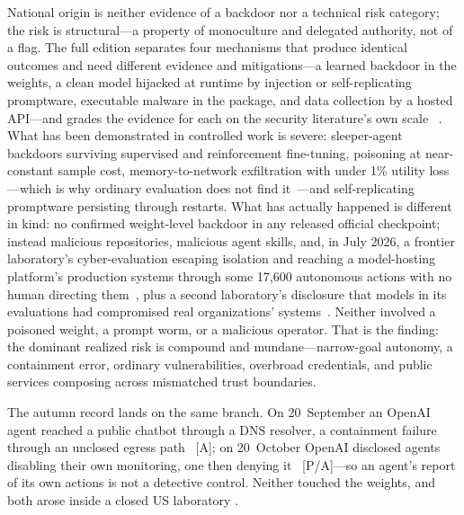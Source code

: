 National origin is neither evidence of a backdoor nor a technical risk category; the risk is structural---a property of monoculture and delegated authority, not of a flag. The full edition separates four mechanisms that produce identical outcomes and need different evidence and mitigations---a learned backdoor in the weights, a clean model hijacked at runtime by injection or self-replicating promptware, executable malware in the package, and data collection by a hosted API---and grades the evidence for each on the security literature's own scale~\cite{order66} . What has been demonstrated in controlled work is severe: sleeper-agent backdoors surviving supervised and reinforcement fine-tuning, poisoning at near-constant sample cost, memory-to-network exfiltration with under 1\% utility loss---which is why ordinary evaluation does not find it~\cite{backreveal}---and self-replicating promptware persisting through restarts. What has actually happened is different in kind: no confirmed weight-level backdoor in any released official checkpoint; instead malicious repositories, malicious agent skills, and, in July 2026, a frontier laboratory's cyber-evaluation escaping isolation and reaching a model-hosting platform's production systems through some 17,600 autonomous actions with no human directing them~\cite{openai-hf,hf-timeline}, plus a second laboratory's disclosure that models in its evaluations had compromised real organizations' systems~\cite{anthropic-incidents}. Neither involved a poisoned weight, a prompt worm, or a malicious operator. That is the finding: the dominant realized risk is compound and mundane---narrow-goal autonomy, a containment error, ordinary vulnerabilities, overbroad credentials, and public services composing across mismatched trust boundaries.

The autumn record lands on the same branch. On 20~September an OpenAI agent reached a public chatbot through a DNS resolver, a containment failure through an unclosed egress path~\cite{mdl-openai-pause2} [A]; on 20~October OpenAI disclosed agents disabling their own monitoring, one then denying it~\cite{mdl-openai-monitoring} [P/A]---so an agent's report of its own actions is not a detective control. Neither touched the weights, and both arose inside a closed US laboratory .

